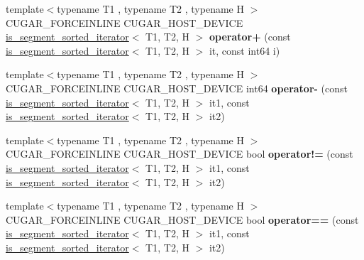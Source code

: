\begin{DoxyCompactItemize}
\item 
\mbox{\label{namespacecugar_ac7ee0703fce600e71cd1a03406583f4f}} 
{\footnotesize template$<$typename T1 , typename T2 , typename H $>$ }\\C\+U\+G\+A\+R\+\_\+\+F\+O\+R\+C\+E\+I\+N\+L\+I\+NE C\+U\+G\+A\+R\+\_\+\+H\+O\+S\+T\+\_\+\+D\+E\+V\+I\+CE \hyperlink{structcugar_1_1is__segment__sorted__iterator}{is\+\_\+segment\+\_\+sorted\+\_\+iterator}$<$ T1, T2, H $>$ {\bfseries operator+} (const \hyperlink{structcugar_1_1is__segment__sorted__iterator}{is\+\_\+segment\+\_\+sorted\+\_\+iterator}$<$ T1, T2, H $>$ it, const int64 i)
\item 
\mbox{\label{namespacecugar_a61a4f539ddcf97526ba4da650a66cf31}} 
{\footnotesize template$<$typename T1 , typename T2 , typename H $>$ }\\C\+U\+G\+A\+R\+\_\+\+F\+O\+R\+C\+E\+I\+N\+L\+I\+NE C\+U\+G\+A\+R\+\_\+\+H\+O\+S\+T\+\_\+\+D\+E\+V\+I\+CE int64 {\bfseries operator-\/} (const \hyperlink{structcugar_1_1is__segment__sorted__iterator}{is\+\_\+segment\+\_\+sorted\+\_\+iterator}$<$ T1, T2, H $>$ it1, const \hyperlink{structcugar_1_1is__segment__sorted__iterator}{is\+\_\+segment\+\_\+sorted\+\_\+iterator}$<$ T1, T2, H $>$ it2)
\item 
\mbox{\label{namespacecugar_abe34ae762eb40722862fe11d1a6ceee8}} 
{\footnotesize template$<$typename T1 , typename T2 , typename H $>$ }\\C\+U\+G\+A\+R\+\_\+\+F\+O\+R\+C\+E\+I\+N\+L\+I\+NE C\+U\+G\+A\+R\+\_\+\+H\+O\+S\+T\+\_\+\+D\+E\+V\+I\+CE bool {\bfseries operator!=} (const \hyperlink{structcugar_1_1is__segment__sorted__iterator}{is\+\_\+segment\+\_\+sorted\+\_\+iterator}$<$ T1, T2, H $>$ it1, const \hyperlink{structcugar_1_1is__segment__sorted__iterator}{is\+\_\+segment\+\_\+sorted\+\_\+iterator}$<$ T1, T2, H $>$ it2)
\item 
\mbox{\label{namespacecugar_aa9ae2567642dd527f5ff6a8eab02a69f}} 
{\footnotesize template$<$typename T1 , typename T2 , typename H $>$ }\\C\+U\+G\+A\+R\+\_\+\+F\+O\+R\+C\+E\+I\+N\+L\+I\+NE C\+U\+G\+A\+R\+\_\+\+H\+O\+S\+T\+\_\+\+D\+E\+V\+I\+CE bool {\bfseries operator==} (const \hyperlink{structcugar_1_1is__segment__sorted__iterator}{is\+\_\+segment\+\_\+sorted\+\_\+iterator}$<$ T1, T2, H $>$ it1, const \hyperlink{structcugar_1_1is__segment__sorted__iterator}{is\+\_\+segment\+\_\+sorted\+\_\+iterator}$<$ T1, T2, H $>$ it2)

\end{DoxyCompactItemize}
